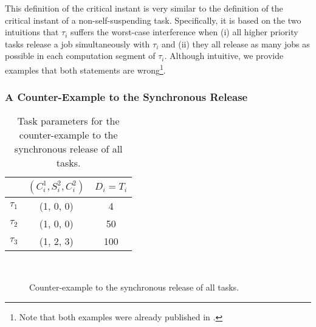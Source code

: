 This definition of the critical instant is very similar to the definition of the critical instant of a non-self-suspending task. Specifically, it is based on the two intuitions that $\tau_i$ suffers the worst-case interference when (i) all higher priority tasks release a job simultaneously with $\tau_i$ and (ii) they all release as many jobs as possible in each computation segment of $\tau_i$. Although intuitive, we provide examples that both statements are wrong\footnote{Note that both examples were already published in \cite{ecrts15nelissen}.}.

\subsubsection{A Counter-Example to the Synchronous Release}

\begin{table} 
\centering
    \begin{tabular}{|c|c|c|}
 \hline
        & $(C_i^1, S_i^2, C_i^2)$ &  $D_i=T_i$\\ 
        \hline
        $\tau_1$ & (1, 0, 0) &  4\\ 
        $\tau_2$ &  (1, 0, 0) & 50  \\ 
        $\tau_3$ & (1, 2, 3) & 100  \\
        \hline
    \end{tabular} 
    \caption{Task parameters for the counter-example to the synchronous release of all tasks.}
    \label{table:ex-synch-releases}
\end{table}

\begin{figure}
  \centering
   \\
  \caption{Counter-example to the synchronous release of all tasks.}
  \label{fig:ex-synch-releases}
\end{figure}

